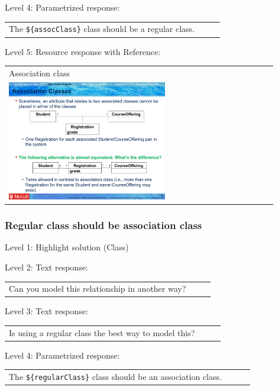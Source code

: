 \noindent Level 4: Parametrized response: \medskip

\begin{tabular}{|p{0.9\linewidth}}
The \verb|${assocClass}| class should be a regular class.
\end{tabular} \medskip

\noindent Level 5: Resource response with Reference: \medskip

\begin{tabular}{|p{0.9\linewidth}}
Association class

\\
\includegraphics[width=0.6\textwidth]{images/association_class.png}
\end{tabular} \medskip


\subsubsection{Regular class should be association class}

\noindent Level 1: Highlight solution (Class) \medskip

\noindent Level 2: Text response: \medskip

\begin{tabular}{|p{0.9\linewidth}}
Can you model this relationship in another way?
\end{tabular} \medskip

\noindent Level 3: Text response: \medskip

\begin{tabular}{|p{0.9\linewidth}}
Is using a regular class the best way to model this?
\end{tabular} \medskip

\noindent Level 4: Parametrized response: \medskip

\begin{tabular}{|p{0.9\linewidth}}
The \verb|${regularClass}| class should be an association class.
\end{tabular} \medskip

